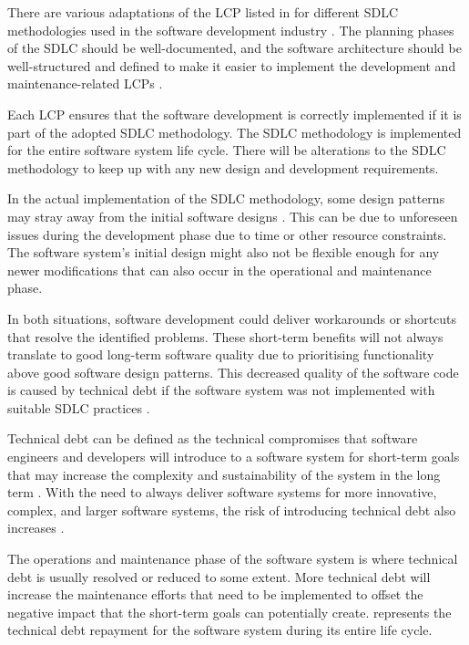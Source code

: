 There are various adaptations of the LCP listed in  for different SDLC methodologies used in the software development industry \cite{Al-Saiyd2015}. The planning phases of the SDLC should be well-documented, and the software architecture should be well-structured and defined to make it easier to implement the development and maintenance-related LCPs \cite{Ackermann2009}.\par Each LCP ensures that the software development is correctly implemented if it is part of the adopted SDLC methodology. The SDLC methodology is implemented for the entire software system life cycle. There will be alterations to the SDLC methodology to keep up with any new design and development requirements.\par In the actual implementation of the SDLC methodology, some design patterns may stray away from the initial software designs \cite{Reimanis2016}. This can be due to unforeseen issues during the development phase due to time or other resource constraints. The software system's initial design might also not be flexible enough for any newer modifications that can also occur in the operational and maintenance phase.\par In both situations, software development could deliver workarounds or shortcuts that resolve the identified problems. These short-term benefits will not always translate to good long-term software quality due to prioritising functionality above good software design patterns. This decreased quality of the software code is caused by technical debt if the software system was not implemented with suitable SDLC practices \cite{DeLeon-Sigg2020, Reimanis2016}.\par Technical debt can be defined as the technical compromises that software engineers and developers will introduce to a software system for short-term goals that may increase the complexity and sustainability of the system in the long term \cite{Snipes2018, Gralha2018}. With the need to always deliver software systems for more innovative, complex, and larger software systems, the risk of introducing technical debt also increases \cite{Reimanis2016, Khan2013}.\par The operations and maintenance phase of the software system is where technical debt is usually resolved or reduced to some extent. More technical debt will increase the maintenance efforts that need to be implemented to offset the negative impact that the short-term goals can potentially create.  represents the technical debt repayment for the software system during its entire life cycle.

